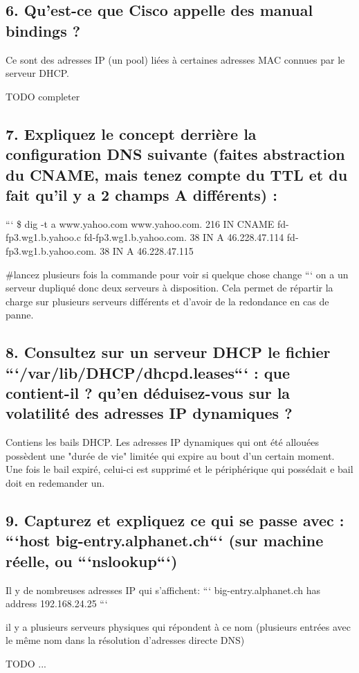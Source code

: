\documentclass{article}
\begin{document}
\subsection*{6. Qu’est-ce que Cisco appelle des manual bindings ?}
Ce sont des adresses IP (un pool) liées à certaines adresses MAC connues par le serveur DHCP.

TODO completer

\subsection*{7. Expliquez le concept derrière la configuration DNS suivante (faites abstraction du CNAME, mais tenez compte du TTL et du fait qu’il y a 2 champs A différents) :}
```
\$ dig -t a www.yahoo.com
www.yahoo.com.            216   IN    CNAME   fd-fp3.wg1.b.yahoo.c
fd-fp3.wg1.b.yahoo.com.   38    IN    A       46.228.47.114
fd-fp3.wg1.b.yahoo.com.   38    IN    A       46.228.47.115

\#lancez plusieurs fois la commande pour voir si quelque chose change
```
on a un serveur dupliqué donc deux serveurs à disposition. Cela permet de répartir la charge sur plusieurs serveurs différents et d'avoir de la redondance en cas de panne.

\subsection*{8. Consultez sur un serveur DHCP le fichier ```/var/lib/DHCP/dhcpd.leases``` : que contient-il ? qu’en déduisez-vous sur la volatilité des adresses IP dynamiques ?}
Contiens les bails DHCP. Les adresses IP dynamiques qui ont été allouées possèdent une "durée de vie" limitée qui expire au bout d'un certain moment. Une fois le bail expiré, celui-ci est supprimé et le périphérique qui possédait e bail doit en redemander un.

\subsection*{9. Capturez et expliquez ce qui se passe avec : ```host big-entry.alphanet.ch``` (sur machine réelle, ou ```nslookup```)}
Il y de nombreuses adresses IP qui s'affichent:
```
big-entry.alphanet.ch has address 192.168.24.25
```

il y a plusieurs serveurs physiques qui répondent à ce nom (plusieurs entrées avec le même nom dans la résolution d'adresses directe DNS)

TODO ...
\end{document}
